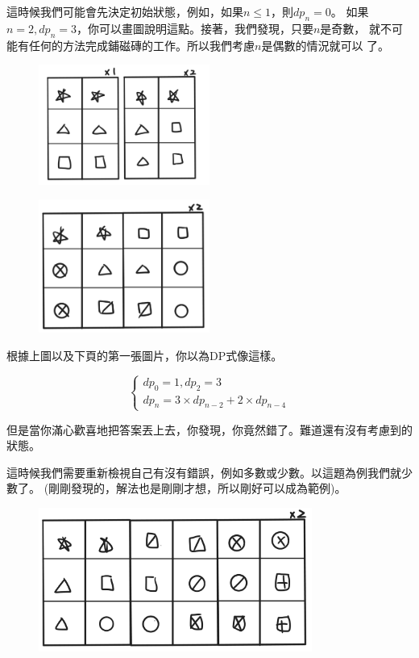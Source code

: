     這時候我們可能會先決定初始狀態，例如，如果$n \le 1$，則$dp_n=0$。
    如果$n=2, dp_n=3$，你可以畫圖說明這點。接著，我們發現，只要$n$是奇數，
    就不可能有任何的方法完成鋪磁磚的工作。所以我們考慮$n$是偶數的情況就可以
    了。

    \begin{figure}[!htbp]
        \centering
        \includegraphics[width=0.5\textwidth]{../Images/DP1.png}
    \end{figure}

    \begin{figure}[!htbp]
        \centering
        \includegraphics[width=0.5\textwidth]{../Images/DP2.png}
    \end{figure}

    根據上圖以及下頁的第一張圖片，你以為DP式像這樣。
    
    $$
    \begin{cases}
        dp_0=1, dp_2=3 \\
        dp_n=3 \times dp_{n-2}+2 \times dp_{n-4}
    \end{cases}
    $$
    
    但是當你滿心歡喜地把答案丟上去，你發現，你竟然錯了。難道還有沒有考慮到的狀態。

    這時候我們需要重新檢視自己有沒有錯誤，例如多數或少數。以這題為例我們就少數了。
    (剛剛發現的，解法也是剛剛才想，所以剛好可以成為範例)。

    \begin{figure}[!htbp]
        \centering
        \includegraphics[width=0.8\textwidth]{../Images/DP3.png}
    \end{figure}

